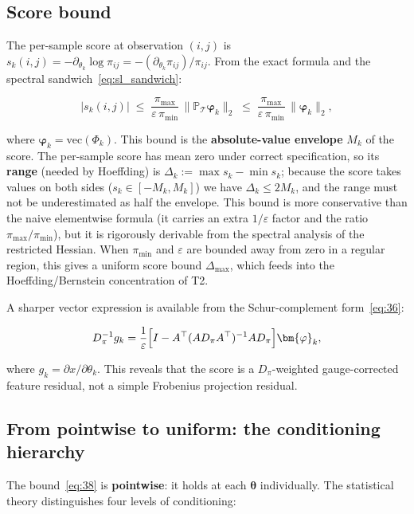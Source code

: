 \documentclass[11pt,a4paper]{article}
\theoremstyle{remark}
\renewcommand{\phi}{\bm{\varphi}}
\begin{document}
\subsection{Score bound}

The per-sample score at observation $(i,j)$ is
$s_k(i,j)=-\partial_{\theta_k}\log\pi_{ij}=-(\partial_{\theta_k}\pi_{ij})/\pi_{ij}$. From
the exact formula and the spectral sandwich~\eqref{eq:sl_sandwich}:

\[
|s_k(i,j)|\;\le\;\frac{\pi_{\max}}{\varepsilon\,\pi_{\min}}\,\|\mathbb{P}_{\mathcal{T}}\phi_k\|_2
\;\le\;\frac{\pi_{\max}}{\varepsilon\,\pi_{\min}}\,\|\phi_k\|_2, \label{eq:39}
\]

where $\phi_k=\mathrm{vec}(\Phi_k)$. This bound is the \textbf{absolute-value envelope}
$M_k$ of the score. The per-sample score has mean zero under correct specification, so its
\textbf{range} (needed by Hoeffding) is $\Delta_k:=\max s_k-\min s_k$; because the score
takes values on both sides ($s_k\in[-M_k,M_k]$) we have $\Delta_k\le2M_k$, and the range
must not be underestimated as half the envelope. This bound is more conservative than the
naive elementwise formula (it carries an extra $1/\varepsilon$ factor and the ratio
$\pi_{\max}/\pi_{\min}$), but it is rigorously derivable from the spectral analysis of the
restricted Hessian. When $\pi_{\min}$ and $\varepsilon$ are bounded away from zero in a
regular region, this gives a uniform score bound $\Delta_{\max}$, which feeds into the
Hoeffding/Bernstein concentration of T2.

A sharper vector expression is available from the Schur-complement form~\eqref{eq:36}:

\[
D_\pi^{-1}g_k=\frac{1}{\varepsilon}\Bigl[I-A^{\top}(AD_\pi A^{\top})^{-1}AD_\pi\Bigr]\phi_k,
\]

where $g_k=\partial x/\partial\theta_k$. This reveals that the score is a
$D_\pi$-weighted gauge-corrected feature residual, not a simple Frobenius projection
residual.

\subsection{From pointwise to uniform: the conditioning hierarchy}

The bound~\eqref{eq:38} is \textbf{pointwise}: it holds at each $\bm{\theta}$ individually.
The statistical theory distinguishes four levels of conditioning:
\end{document}
